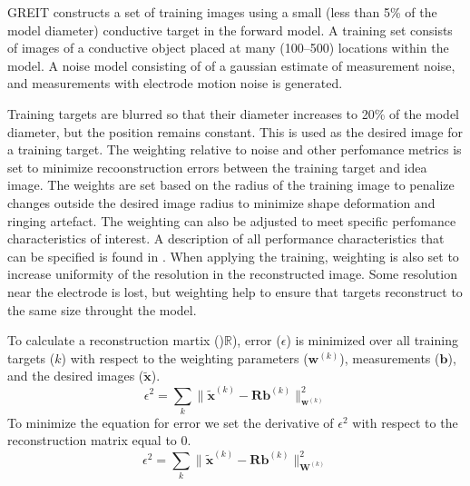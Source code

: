 GREIT constructs a set of training images using a small (less than 5\% of the model diameter) 
conductive target in the 
forward model. A training set consists of images of a conductive object
placed at many (100--500) locations within the model. 
A noise model consisting of of a gaussian estimate of measurement noise, 
and measurements with electrode motion noise is generated. 

Training targets are blurred so that their diameter increases to 20\% of 
the model diameter, but the position remains constant. 
This is used as the desired image for a training target. 
The weighting relative to noise and other perfomance metrics 
is set to minimize recoonstruction errors between the training target and idea image. 
The weights are set based on the radius of the training image to penalize
changes outside the desired image radius to minimize shape deformation
and ringing artefact. The weighting can also be adjusted to meet specific perfomance 
characteristics of interest. A description of all performance characteristics that 
can be specified is found in \parencite{adler_greit_2009}.
When applying the training, weighting is also set to increase uniformity 
of the resolution in the reconstructed image. Some resolution near the electrode is 
lost, but weighting help to ensure that targets reconstruct to the same size throught the model.

To calculate a reconstruction martix ()$\mathbb{R}$), error ($\epsilon$)
is minimized over all training targets ($k$) with respect to the 
weighting parameters ($\mathbf{w}^{(k)}$),
measurements ($\mathbf{b}$), and the desired images ($\mathbf{\tilde{x}}$).
\begin{equation} \label{eq:greit_min}
	\epsilon^2 = \sum_{k} \|\mathbf{\tilde{x}}^{(k)}
    - \mathbf{Rb}^{(k)}\|^{2}_{\mathbf{w}^{(k)}}
\end{equation}
To minimize the equation for error we set the derivative of $\epsilon^2$ with respect to the reconstruction 
matrix equal to 0.
\begin{equation} 
	\epsilon^2 = \sum_{k} \|\mathbf{\tilde{x}}^{(k)}
    - \mathbf{Rb}^{(k)}\|^{2}_{\mathbf{W}^{(k)}}
\end{equation}

